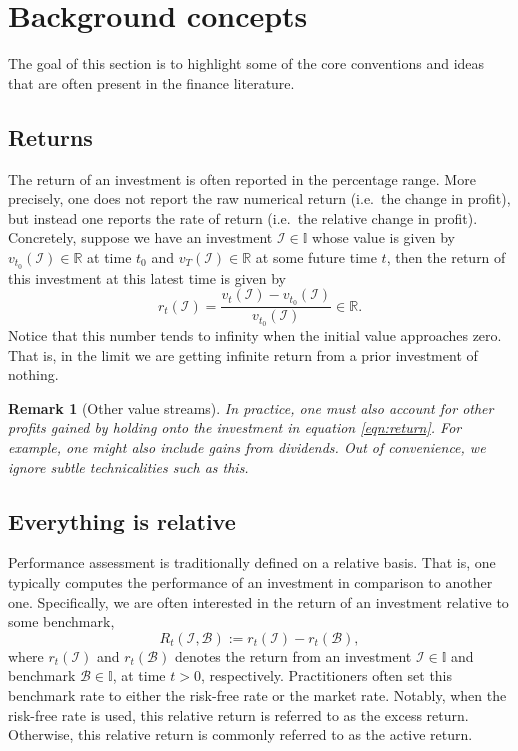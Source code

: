 \documentclass[12pt]{article}
\newtheorem{remark}{Remark}[section]
\begin{document}
\section{Background concepts}
The goal of this section is to highlight some of the core conventions and ideas that are often present in the finance literature.
\subsection{Returns}
The return of an investment is often reported in the percentage range. More precisely, one does not report the raw numerical return (i.e.\ the change in profit), but instead one reports the rate of return (i.e.\ the relative change in profit). Concretely, suppose we have an investment $\mathcal{I} \in \mathbb{I}$ whose value is given by $v_{t_0}(\mathcal{I}) \in \mathbb{R}$ at time $t_0$ and $v_T(\mathcal{I}) \in \mathbb{R}$ at some future time $t$, then the return of this investment at this latest time is given by
\begin{equation}
    r_t(\mathcal{I}) = \frac{v_t(\mathcal{I}) - v_{t_0}(\mathcal{I})}{v_{t_0}(\mathcal{I})} \in \mathbb{R}.
    \label{eqn:return}
\end{equation}
Notice that this number tends to infinity when the initial value approaches zero. That is, in the limit we are getting infinite return from a prior investment of nothing.

\begin{remark}
	[Other value streams] In practice, one must also account for other profits gained by holding onto the investment in equation \eqref{eqn:return}. For example, one might also include gains from dividends. Out of convenience, we ignore subtle technicalities such as this.
\end{remark}

\subsection{Everything is relative}
Performance assessment is traditionally defined on a relative basis. That is, one typically computes the performance of an investment in comparison to another one. Specifically, we are often interested in the return of an investment relative to some benchmark,
\begin{equation}
    R_t(\mathcal{I}, \mathcal{B}) := r_t(\mathcal{I}) - r_t(\mathcal{B}),
    \label{eqn:relative_return}
\end{equation}
where $r_t(\mathcal{I})$ and $r_t(\mathcal{B})$ denotes the return from an investment $\mathcal{I} \in \mathbb{I}$ and benchmark $\mathcal{B} \in \mathbb{I}$, at time $t > 0$, respectively. Practitioners often set this benchmark rate to either the risk-free rate or the market rate. Notably, when the risk-free rate is used, this relative return is referred to as the excess return. Otherwise, this relative return is commonly referred to as the active return.
\end{document}
